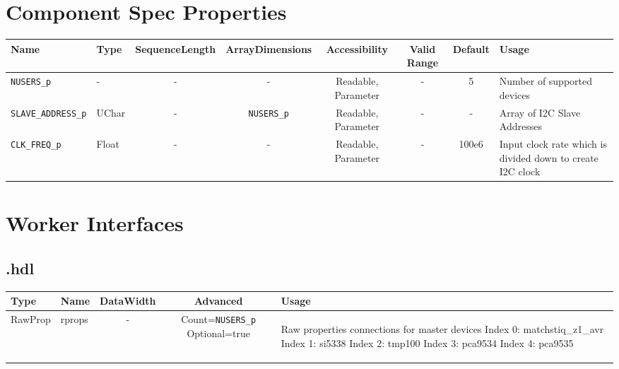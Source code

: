 \begin{landscape}
\section*{Component Spec Properties}
	\begin{scriptsize}
		\begin{tabular}{|p{3cm}|p{1.5cm}|c|c|c|c|c|p{7cm}|}
			\hline
			\rowcolor{blue}
			Name                   & Type   & SequenceLength & ArrayDimensions & Accessibility       & Valid Range & Default & Usage                        \\
			\hline
			\verb+NUSERS_p+        & -      & -              & -               & Readable, Parameter & -           & 5       & Number of supported devices     \\
			\hline
			\verb+SLAVE_ADDRESS_p+ & UChar  & -              & \verb+NUSERS_p+ & Readable, Parameter & -           & -       & Array of I2C Slave Addresses \\
			\hline
			\verb+CLK_FREQ_p+       & Float & -              & -               & Readable, Parameter & -           & 100e6 & Input clock rate which is divided down to create I2C clock  \\
			\hline
		\end{tabular}
	\end{scriptsize}

	\section*{Worker Interfaces}
	\subsection*{\comp.hdl}
	\begin{scriptsize}
		\begin{tabular}{|M{2cm}|M{1.5cm}|c|c|M{6cm}|}
			\hline
			\rowcolor{blue}
			Type & Name & DataWidth & Advanced & Usage \\
			\hline
			RawProp
			& rprops
			& -
			& Count=\verb+NUSERS_p+ Optional=true
			& \begin{flushleft}Raw properties connections for master devices \newline Index 0: matchstiq\_z1\_avr \newline Index 1: si5338 \newline Index 2: tmp100 \newline Index 3: pca9534 \newline Index 4: pca9535 \end{flushleft}\\
			\hline
		\end{tabular}
	\end{scriptsize}


\end{landscape}
